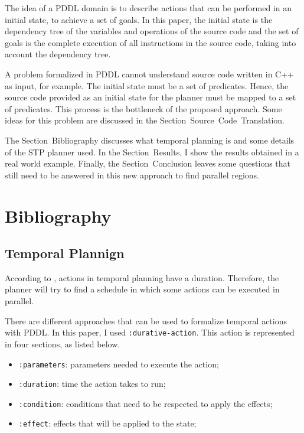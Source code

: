 \documentclass[letterpaper]{article}
\begin{document}
The idea of a PDDL domain is to describe actions that can be performed in an initial state, to achieve a set of goals. In this paper, the initial state is the dependency tree of the variables and operations of the source code and the set of goals is the complete execution of all instructions in the source code, taking into account the dependency tree.

A problem formalized in PDDL cannot understand source code written in C++ as input, for example. The initial state must be a set of predicates. Hence, the source code provided as an initial state for the planner must be mapped to a set of predicates. This process is the bottleneck of the proposed approach. Some ideas for this problem are discussed in the Section~Source~Code~Translation.

The Section~Bibliography discusses what temporal planning is and some details of the STP planner used. In the Section~Results, I show the results obtained in a real world example. Finally, the Section~Conclusion leaves some questions that still need to be answered in this new approach to find parallel regions.


\section{Bibliography}

\subsection{Temporal Plannign} \label{label:temporal-planning}

According to \cite{DBLP:series/synthesis/2019Haslum}, actions in temporal planning have a duration. Therefore, the planner will try to find a schedule in which some actions can be executed in parallel.

There are different approaches that can be used to formalize temporal actions with PDDL. In this paper, I used \texttt{:durative-action}. This action is represented in four sections, as listed below.

\begin{itemize}
    \item \texttt{:parameters}: parameters needed to execute the action;
    \item \texttt{:duration}: time the action takes to run;
    \item \texttt{:condition}: conditions that need to be respected to apply the effects;
    \item \texttt{:effect}: effects that will be applied to the state;
\end{itemize}
\end{document}
